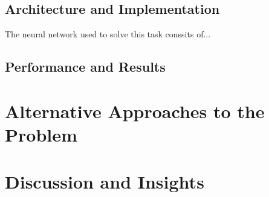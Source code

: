 \documentclass[
  12pt,
  bibliography=totoc,     %
  captions=tableheading,  %
  titlepage=firstiscover, %
]{scrartcl}
\begin{document}
\subsection{Architecture and Implementation}
The neural network used to solve this task conssits of...
\subsection{Performance and Results}

\section{Alternative Approaches to the Problem}

\section{Discussion and Insights}

\printbibliography
\end{document}
